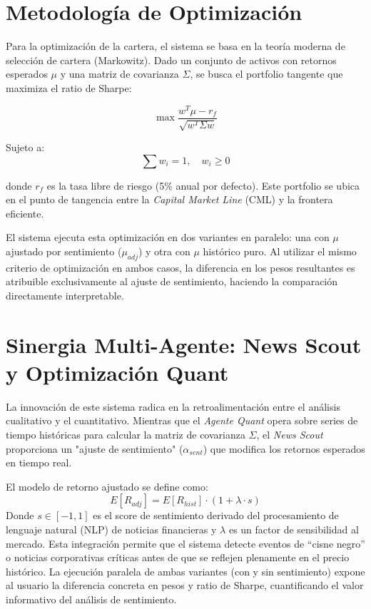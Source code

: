 \documentclass[10pt]{article}
\begin{document}
\section{Metodología de Optimización}
Para la optimización de la cartera, el sistema se basa en la teoría moderna de selección de cartera (Markowitz). Dado un conjunto de activos con retornos esperados $\mu$ y una matriz de covarianza $\Sigma$, se busca el portfolio tangente que maximiza el ratio de Sharpe:

$$ \max \frac{w^T \mu - r_f}{\sqrt{w^T \Sigma w}} $$

Sujeto a:
$$ \sum w_i = 1, \quad w_i \geq 0 $$

donde $r_f$ es la tasa libre de riesgo (5\% anual por defecto). Este portfolio se ubica en el punto de tangencia entre la \textit{Capital Market Line} (CML) y la frontera eficiente.

El sistema ejecuta esta optimización en dos variantes en paralelo: una con $\mu$ ajustado por sentimiento ($\mu_{adj}$) y otra con $\mu$ histórico puro. Al utilizar el mismo criterio de optimización en ambos casos, la diferencia en los pesos resultantes es atribuible exclusivamente al ajuste de sentimiento, haciendo la comparación directamente interpretable.


\section{Sinergia Multi-Agente: News Scout y Optimización Quant}
La innovación de este sistema radica en la retroalimentación entre el análisis cualitativo y el cuantitativo. Mientras que el \textit{Agente Quant} opera sobre series de tiempo históricas para calcular la matriz de covarianza $\Sigma$, el \textit{News Scout} proporciona un "ajuste de sentimiento" ($\alpha_{sent}$) que modifica los retornos esperados en tiempo real.

El modelo de retorno ajustado se define como:
\[ E[R_{adj}] = E[R_{hist}] \cdot (1 + \lambda \cdot s) \]
Donde $s \in [-1, 1]$ es el score de sentimiento derivado del procesamiento de lenguaje natural (NLP) de noticias financieras y $\lambda$ es un factor de sensibilidad al mercado. Esta integración permite que el sistema detecte eventos de ``cisne negro'' o noticias corporativas críticas antes de que se reflejen plenamente en el precio histórico. La ejecución paralela de ambas variantes (con y sin sentimiento) expone al usuario la diferencia concreta en pesos y ratio de Sharpe, cuantificando el valor informativo del análisis de sentimiento.
\end{document}
